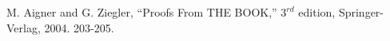 \documentclass[10pt]{amsart}
\begin{document}


\begin{thebibliography}{10}

 M. Aigner and G. Ziegler, ``Proofs From THE BOOK,'' $3^{rd}$ edition, Springer-Verlag, 2004. 203-205.

\end{thebibliography}
\end{document}
